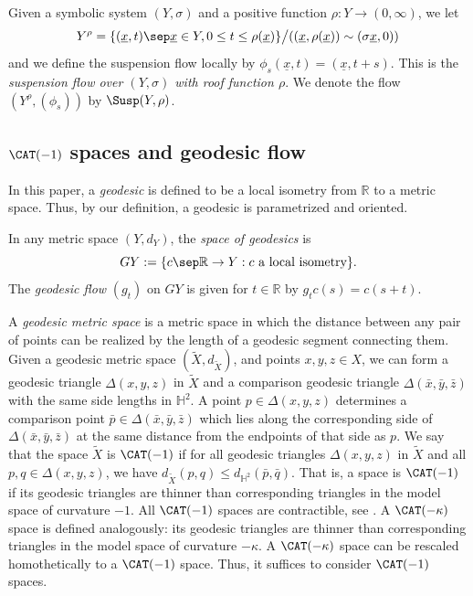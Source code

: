 \begin{defn}
Given a symbolic system $(Y, \sigma)$ and a positive function $\rho: Y \to (0,\infty)$, we let
\[
Y^{\rho} = \{ (\underline x,t)\sep \underline x\in Y, 0\leq t \leq \rho(\underline x) \}\big/((\underline x, \rho(\underline x))\sim(\sigma \underline x,0))\]
and we define the suspension flow locally by $\phi_s(\underline x, t) = (\underline x, t+s).$ This is the \emph{suspension flow over $(Y, \sigma)$ with roof function $\rho$}. We denote the flow $(Y^{\rho}, (\phi_s))$ by $\Susp(Y, \rho)$.
\end{defn}

\subsection{$\CAT(-1)$ spaces and geodesic flow}\label{subsec:CAT (-1)}

In this paper, a \emph{geodesic} is defined to be a local isometry from $\mathbb{R}$ to a metric space. Thus, by our definition, a geodesic is parametrized and oriented.

\begin{defn}
In any metric space $(Y,d_Y)$, the \emph{space of geodesics} is
\[ GY:= \{ c\sep\mathbb{R} \rightarrow Y : c \text{ a local isometry}\}.\]
The \emph{geodesic flow} $(g_t)$ on $GY$ is given for $t \in \mathbb R$ by $g_tc(s) = c(s+t)$.
\end{defn}

A \emph{geodesic metric space} is a metric space in which the distance between any pair of points can be realized by the length of a geodesic segment connecting them. Given a geodesic metric space $(\tilde X,d_{\tilde X})$, and points $x,y,z \in X$, we can form a geodesic triangle $\Delta(x,y,z)$ in $\tilde X$ and a comparison geodesic triangle $\Delta(\bar x, \bar y, \bar z)$ with the same side lengths in $\mathbb{H}^2$. A point $p \in \Delta(x,y,z)$ determines a comparison point $\bar p \in \Delta(\bar x, \bar y, \bar z)$ which lies along the corresponding side of $\Delta(\bar x, \bar y, \bar z)$ at the same distance from the endpoints of that side as $p$. We say that the space $\tilde X$ is $\CAT(-1)$ if for all geodesic triangles $\Delta(x,y,z)$ in $\tilde X$ and all $p,q \in \Delta(x,y,z)$, we have $d_{\tilde X}(p,q)\leq d_{\mathbb{H}^2}(\bar p, \bar q)$. That is, a space is $\CAT(-1)$ if its geodesic triangles are thinner than corresponding triangles in the model space of curvature $-1$. All $\CAT(-1)$ spaces are contractible, see \eg \cite[Chap.\,3, Props\,28 \&\,29]{troyanov}. A $\CAT(-\kappa)$ space is defined analogously: its geodesic triangles are thinner than corresponding triangles in the model space of curvature $-\kappa$. A $\CAT(- \kappa)$ space can be rescaled homothetically to a $\CAT(-1)$ space. Thus, it suffices to consider $\CAT(-1)$ spaces.

